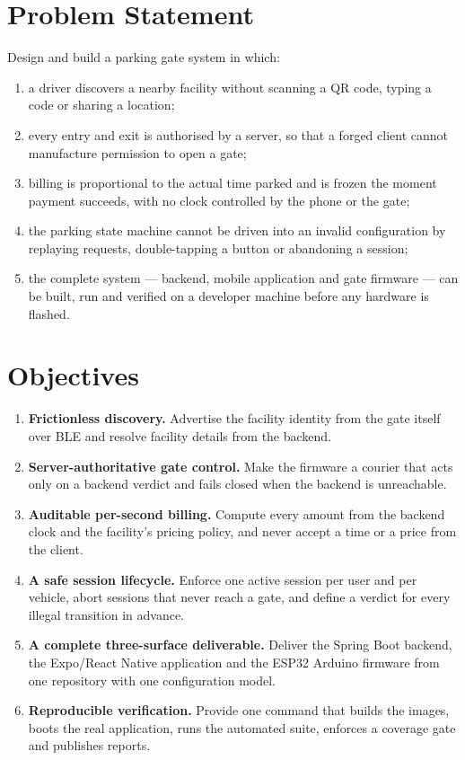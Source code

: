 \section{Problem Statement}

Design and build a parking gate system in which:

\begin{enumerate}
  \item a driver discovers a nearby facility without scanning a QR code, typing a
        code or sharing a location;
  \item every entry and exit is authorised by a server, so that a forged client
        cannot manufacture permission to open a gate;
  \item billing is proportional to the actual time parked and is frozen the moment
        payment succeeds, with no clock controlled by the phone or the gate;
  \item the parking state machine cannot be driven into an invalid configuration
        by replaying requests, double-tapping a button or abandoning a session;
  \item the complete system --- backend, mobile application and gate firmware ---
        can be built, run and verified on a developer machine before any hardware
        is flashed.
\end{enumerate}

\section{Objectives}

\begin{enumerate}
  \item \textbf{Frictionless discovery.} Advertise the facility identity from the
        gate itself over BLE and resolve facility details from the backend.
  \item \textbf{Server-authoritative gate control.} Make the firmware a courier
        that acts only on a backend verdict and fails closed when the backend is
        unreachable.
  \item \textbf{Auditable per-second billing.} Compute every amount from the
        backend clock and the facility's pricing policy, and never accept a time
        or a price from the client.
  \item \textbf{A safe session lifecycle.} Enforce one active session per user and
        per vehicle, abort sessions that never reach a gate, and define a verdict
        for every illegal transition in advance.
  \item \textbf{A complete three-surface deliverable.} Deliver the Spring Boot
        backend, the Expo/React Native application and the ESP32 Arduino firmware
        from one repository with one configuration model.
  \item \textbf{Reproducible verification.} Provide one command that builds the
        images, boots the real application, runs the automated suite, enforces a
        coverage gate and publishes reports.
\end{enumerate}

